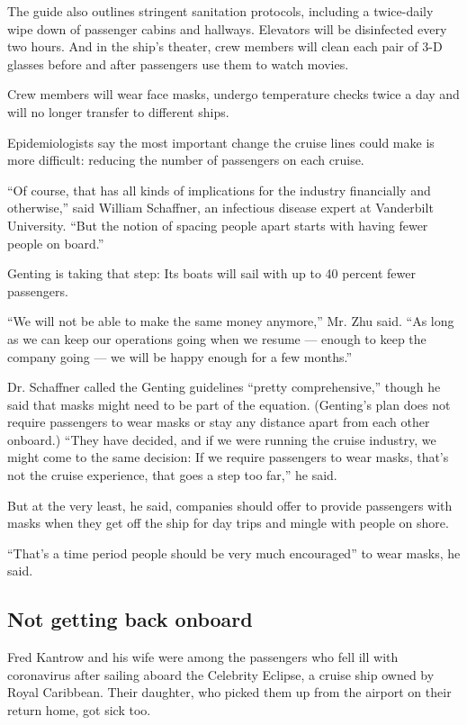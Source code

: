 The guide also outlines stringent sanitation protocols, including a
twice-daily wipe down of passenger cabins and hallways. Elevators will
be disinfected every two hours. And in the ship's theater, crew members
will clean each pair of 3-D glasses before and after passengers use them
to watch movies.

Crew members will wear face masks, undergo temperature checks twice a
day and will no longer transfer to different ships.

Epidemiologists say the most important change the cruise lines could
make is more difficult: reducing the number of passengers on each
cruise.

``Of course, that has all kinds of implications for the industry
financially and otherwise,'' said William Schaffner, an infectious
disease expert at Vanderbilt University. ``But the notion of spacing
people apart starts with having fewer people on board.''

Genting is taking that step: Its boats will sail with up to 40 percent
fewer passengers.

``We will not be able to make the same money anymore,'' Mr. Zhu said.
``As long as we can keep our operations going when we resume --- enough
to keep the company going --- we will be happy enough for a few
months.''

Dr. Schaffner called the Genting guidelines ``pretty comprehensive,''
though he said that masks might need to be part of the equation.
(Genting's plan does not require passengers to wear masks or stay any
distance apart from each other onboard.) ``They have decided, and if we
were running the cruise industry, we might come to the same decision: If
we require passengers to wear masks, that's not the cruise experience,
that goes a step too far,'' he said.

But at the very least, he said, companies should offer to provide
passengers with masks when they get off the ship for day trips and
mingle with people on shore.

``That's a time period people should be very much encouraged'' to wear
masks, he said.

\hypertarget{not-getting-back-onboard}{%
\subsection{Not getting back onboard}\label{not-getting-back-onboard}}

Fred Kantrow and his wife were among the passengers who fell ill with
coronavirus after sailing aboard the Celebrity Eclipse, a cruise ship
owned by Royal Caribbean. Their daughter, who picked them up from the
airport on their return home, got sick too.

